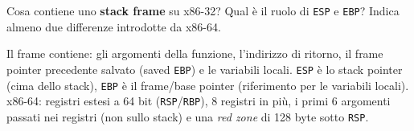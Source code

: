 \question[5]
Cosa contiene uno \textbf{stack frame} su x86-32? Qual è il ruolo di \lstinline|ESP| e \lstinline|EBP|?
Indica almeno due differenze introdotte da x86-64.
\begin{solution}
Il frame contiene: gli argomenti della funzione, l'indirizzo di ritorno, il frame pointer precedente salvato (saved \lstinline|EBP|) e le variabili locali.
\lstinline|ESP| è lo stack pointer (cima dello stack), \lstinline|EBP| è il frame/base pointer (riferimento per le variabili locali).
x86-64: registri estesi a 64 bit (\lstinline|RSP|/\lstinline|RBP|), 8 registri in più, i primi 6 argomenti passati nei registri (non sullo stack) e una \emph{red zone} di 128 byte sotto \lstinline|RSP|.
\end{solution}
